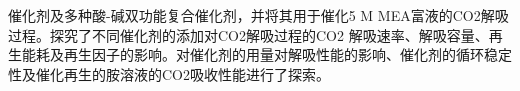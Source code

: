 \begin{summary}
催化剂及多种酸-碱双功能复合催化剂，并将其用于催化5 M MEA富液的CO2解吸过程。探究了不同催化剂的添加对CO2解吸过程的CO2 解吸速率、解吸容量、再生能耗及再生因子的影响。对催化剂的用量对解吸性能的影响、催化剂的循环稳定性及催化再生的胺溶液的CO2吸收性能进行了探索。
\end{summary}
